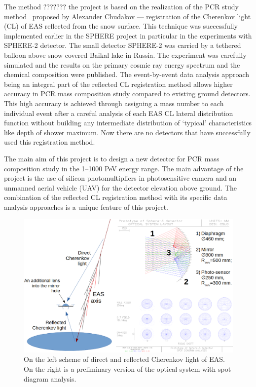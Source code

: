 \documentclass[a4paper]{jpconf}
\begin{document}
The method ??????? the project is based on the realization of the PCR study method~\cite{Chu74} proposed by Alexander Chudakov --- registration of the Cherenkov light (CL) of EAS reflected from the snow surface. This technique was successfully implemented earlier in the SPHERE project\cite{Ant15a} in particular in the experiments with SPHERE-2 detector\cite{Ant20}. The small detector SPHERE-2 was carried by a tethered balloon above snow covered Baikal lake in Russia. The experiment was carefully simulated\cite{Ant19} and the results on the primary cosmic ray energy spectrum and the chemical composition were published\cite{Ant15c}. The event-by-event data analysis approach being an integral part of the reflected CL registration method allows higher accuracy in PCR mass composition study compared to existing ground detectors. This high accuracy is achieved through assigning a mass number to each individual event after a careful analysis of each EAS CL lateral distribution function without building any intermediate distribution of `typical' characteristics like depth of shower maximum. Now there are no detectors that have successfully used this registration method. 

The main aim of this project is to design a new detector for PCR mass composition study in the 1--1000 PeV energy range. The main advantage of the project is the use of silicon photomultipliers in photosensitive camera and an unmanned aerial vehicle (UAV) for the detector elevation above ground. The combination of the reflected CL registration method with its specific data analysis approaches is a unique feature of this project. 


\begin{figure}[t]
\centering %
\includegraphics[height=.35\textheight]{Fig1.png}
\caption{On the left scheme of direct and reflected Cherenkov light of EAS. On the right is a preliminary version of the optical system with spot diagram analysis.}
\label{fig:DirectCL}
\end{figure}
\end{document}
